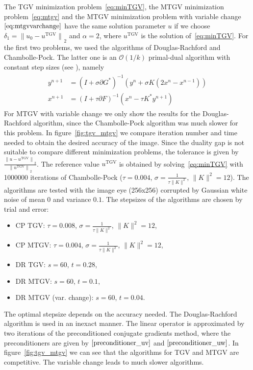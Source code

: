 \documentclass[twocolumn,envcountsame]{svjour3}
\newcommand{\norm}[2][]{{\|{#2}\|_{}}_{#1}}
\DeclareMathOperator{\TGV}{TGV}
\begin{document}
The TGV minimization problem~\eqref{eq:minTGV}, the MTGV minimization problem~\eqref{eq:mtgv}
and the MTGV minimization problem with variable change $\eqref{eq:mtgvvarchange}$
 have the same solution parameter
$u$ if we choose $\delta_1 = \norm[2]{u_0 - u^{\TGV}}$ and $\alpha=2$, where $u^{\TGV}$ is the solution of~\eqref{eq:minTGV}. For the first two problems, we used the algorithms of Douglas-Rachford and Chambolle-Pock. 
The latter one is 
an $\mathcal{O}(1/k)$ primal-dual algorithm with constant step sizes (see
\cite{chambolle2011first}), namely
  \begin{align*}
    \begin{split}
      y^{n+1}&=(I+\sigma\partial G^*)^{-1}(y^n+\sigma K(2x^{n}-x^{n-1}))\\
        x^{n+1}&=(I+\tau\partial F)^{-1}(x^n-\tau K^*y^{n+1})
\end{split}
\end{align*}
For MTGV with variable change we only show the results for the Douglas-Rachford algorithm, since
the Chambolle-Pock algorithm was much slower for this problem.
In figure~\ref{fig:tgv_mtgv} we compare iteration number and time needed to obtain the
desired accuracy of the image. Since the duality gap is not suitable to compare different
minimization problems, the tolerance is given by
$\frac{\norm[2]{u-u^{\TGV}}}{\norm[2]{u^{\TGV}}}$. The reference value
$u^{\TGV}$ is obtained by solving~\eqref{eq:minTGV} with 1000000 iterations of
Chambolle-Pock ($\tau=0.004$,  $\sigma=\frac{1}{\tau\|K\|^2}$, $\|K\|^2=12$). 
The algorithms are tested with the image eye (256x256) corrupted by Gaussian white
noise of mean $0$ and variance $0.1$. The stepsizes of the algorithms are chosen by trial and error:
\begin{itemize}
  \item CP TGV: $\tau=0.008$, $\sigma=\frac{1}{\tau\|K\|^2}$, $\|K\|^2=12$,
  \item CP MTGV: $\tau=0.004$, $\sigma=\frac{1}{\tau\|K\|^2}$, $\|K\|^2=12$,
  \item DR TGV: $s=60$, $t=0.28$,
  \item DR MTGV: $s=60$, $t=0.1$,
  \item DR MTGV (var. change): $s=60$, $t=0.04$.
\end{itemize}
The optimal stepsize depends on the accuracy needed. The Douglas-Rachford algorithm is
used in an inexact manner. The linear operator is approximated by two iterations of the
preconditioned conjugate gradients method, where the preconditioners are given by
$\eqref{preconditioner_uv}$ and $\eqref{preconditioner_uw}$. In figure~\ref{fig:tgv_mtgv} we can see that
the algorithms for TGV and MTGV are competitive. The variable change leads to much slower algorithms.
\end{document}
